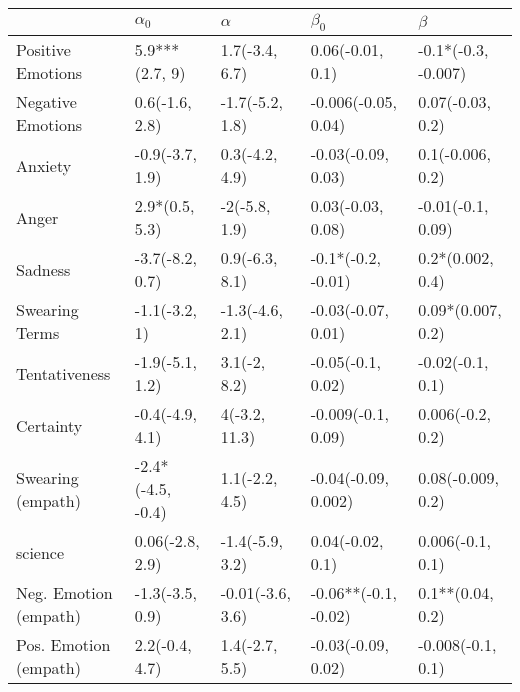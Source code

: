 \begin{tabular}{lllll}
\toprule
{} &         $\alpha_0$ &          $\alpha$ &             $\beta_0$ &              $\beta$ \\
\midrule
Positive Emotions     &     5.9***(2.7, 9) &    1.7(-3.4, 6.7) &      0.06(-0.01, 0.1) &  -0.1*(-0.3, -0.007) \\
Negative Emotions     &     0.6(-1.6, 2.8) &   -1.7(-5.2, 1.8) &   -0.006(-0.05, 0.04) &     0.07(-0.03, 0.2) \\
Anxiety               &    -0.9(-3.7, 1.9) &    0.3(-4.2, 4.9) &    -0.03(-0.09, 0.03) &     0.1(-0.006, 0.2) \\
Anger                 &     2.9*(0.5, 5.3) &     -2(-5.8, 1.9) &     0.03(-0.03, 0.08) &    -0.01(-0.1, 0.09) \\
Sadness               &    -3.7(-8.2, 0.7) &    0.9(-6.3, 8.1) &    -0.1*(-0.2, -0.01) &     0.2*(0.002, 0.4) \\
Swearing Terms        &      -1.1(-3.2, 1) &   -1.3(-4.6, 2.1) &    -0.03(-0.07, 0.01) &    0.09*(0.007, 0.2) \\
Tentativeness         &    -1.9(-5.1, 1.2) &      3.1(-2, 8.2) &     -0.05(-0.1, 0.02) &     -0.02(-0.1, 0.1) \\
Certainty             &    -0.4(-4.9, 4.1) &     4(-3.2, 11.3) &    -0.009(-0.1, 0.09) &     0.006(-0.2, 0.2) \\
Swearing (empath)     &  -2.4*(-4.5, -0.4) &    1.1(-2.2, 4.5) &   -0.04(-0.09, 0.002) &    0.08(-0.009, 0.2) \\
science               &    0.06(-2.8, 2.9) &   -1.4(-5.9, 3.2) &      0.04(-0.02, 0.1) &     0.006(-0.1, 0.1) \\
Neg. Emotion (empath) &    -1.3(-3.5, 0.9) &  -0.01(-3.6, 3.6) &  -0.06**(-0.1, -0.02) &     0.1**(0.04, 0.2) \\
Pos. Emotion (empath) &     2.2(-0.4, 4.7) &    1.4(-2.7, 5.5) &    -0.03(-0.09, 0.02) &    -0.008(-0.1, 0.1) \\
\bottomrule
\end{tabular}
